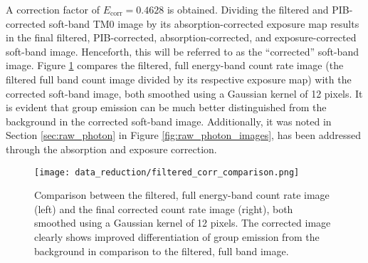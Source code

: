 A correction factor of \(E_\text{corr} = 0.4628\) is obtained. Dividing the filtered and PIB-corrected soft-band TM0 image by its absorption-corrected exposure map results in the final filtered, PIB-corrected, absorption-corrected, and exposure-corrected soft-band image. Henceforth, this will be referred to as the \enquote{corrected} soft-band image. Figure \ref{fig:comparison_filt_corr} compares the filtered, full energy-band count rate image (the filtered full band count image divided by its respective exposure map) with the corrected soft-band image, both smoothed using a Gaussian kernel of 12 pixels. It is evident that group emission can be much better distinguished from the background in the corrected soft-band image. Additionally, it was noted in Section \ref{sec:raw_photon} in Figure \ref{fig:raw_photon_images}, has been addressed through the absorption and exposure correction.
\begin{figure}[htbp]
    \centering
    \texttt{[image: data\_reduction/filtered\_corr\_comparison.png]}
    \caption{Comparison between the filtered, full energy-band count rate image (left) and the final corrected count rate image (right), both smoothed using a Gaussian kernel of 12 pixels. The corrected image clearly shows improved differentiation of group emission from the background in comparison to the filtered, full band image.}
    \label{fig:comparison_filt_corr}
\end{figure}
